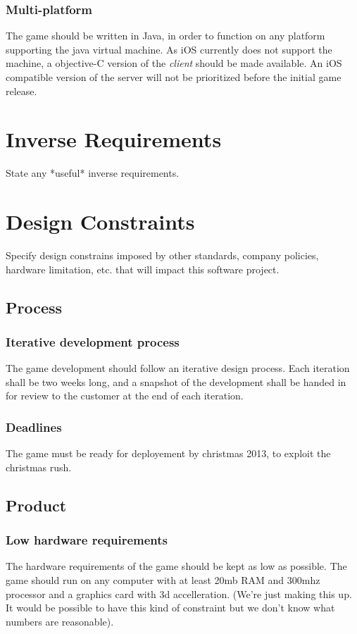 \documentclass[a4paper,10pt]{article}
\begin{document}
\subsubsection{Multi-platform}
The game should be written in Java, in order to function on any platform supporting the java virtual machine. As iOS currently does not support the machine, a objective-C version of the \emph{client} should be made available. An iOS compatible version of the server will not be prioritized before the initial game release.


\section{Inverse Requirements}
State any *useful* inverse requirements.

\section{Design Constraints}
Specify design constrains imposed by other standards, company policies, hardware limitation, etc. that will impact this software project.

\subsection{Process}
\subsubsection{Iterative development process}
The game development should follow an iterative design process. Each iteration shall be two weeks long, and a snapshot of the development shall be handed in for review to the customer at the end of each iteration.

\subsubsection{Deadlines}
The game must be ready for deployement by christmas 2013, to exploit the christmas rush.

\subsection{Product}
\subsubsection{Low hardware requirements}
\label{hwreq}
The hardware requirements of the game should be kept as low as possible. The game should run on any computer with at least 20mb RAM and 300mhz processor and a graphics card with 3d accelleration. (We're just making this up. It would be possible to have this kind of constraint but we don't know what numbers are reasonable).
\end{document}
